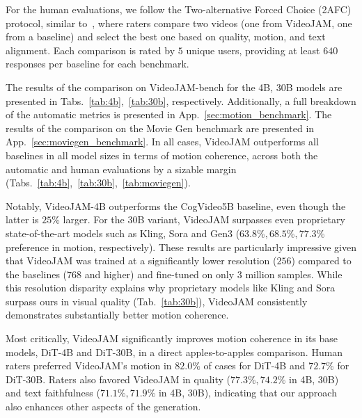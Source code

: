 For the human evaluations, we follow the Two-alternative Forced Choice (2AFC) protocol, similar to~\citet{rombach2021highresolution,sdvideo}, where raters compare two videos (one from VideoJAM, one from a baseline) and select the best one based on quality, motion, and text alignment. Each comparison is rated by $5$ unique users, providing at least $640$ responses per baseline for each benchmark.

The results of the comparison on VideoJAM-bench for the 4B, 30B models are presented in Tabs.~\ref{tab:4b},~\ref{tab:30b}, respectively. Additionally, a full breakdown of the automatic metrics is presented in App.~\ref{sec:motion_benchmark}. The results of the comparison on the Movie Gen benchmark are presented in App.~\ref{sec:moviegen_benchmark}. In all cases, VideoJAM outperforms all baselines in all model sizes in terms of motion coherence, across both the automatic and human evaluations by a sizable margin (Tabs.~\ref{tab:4b},~\ref{tab:30b},~\ref{tab:moviegen}). 

Notably, VideoJAM-4B outperforms the CogVideo5B baseline, even though the latter is $25\%$ larger. For the 30B variant, VideoJAM surpasses even proprietary state-of-the-art models such as Kling, Sora and Gen3 ($63.8\%, 68.5\%, 77.3\%$ preference in motion, respectively).
These results are particularly impressive given that VideoJAM was trained at a significantly lower resolution ($256$) compared to the baselines ($768$ and higher) and fine-tuned on only $3$ million samples. While this resolution disparity explains why proprietary models like Kling and Sora surpass ours in visual quality (Tab.~\ref{tab:30b}), VideoJAM consistently demonstrates substantially better motion coherence.

Most critically, VideoJAM significantly improves motion coherence in its base models, DiT-4B and DiT-30B, in a direct apples-to-apples comparison. Human raters preferred VideoJAM's motion in $82.0\%$ of cases for DiT-4B and $72.7\%$ for DiT-30B. Raters also favored VideoJAM in quality ($77.3\%, 74.2\%$ in 4B, 30B) and text faithfulness ($71.1\%, 71.9\%$ in 4B, 30B), indicating that our approach also enhances other aspects of the generation.

